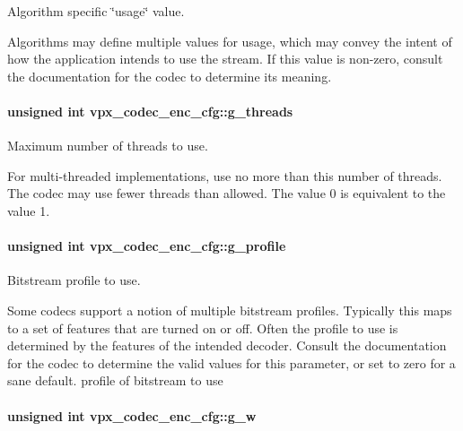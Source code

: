 \-Algorithm specific \char`\"{}usage\char`\"{} value. 

\-Algorithms may define multiple values for usage, which may convey the intent of how the application intends to use the stream. \-If this value is non-\/zero, consult the documentation for the codec to determine its meaning. \hypertarget{structvpx__codec__enc__cfg_aff9d8d458c45c95dd542603210ba2b8b}{
\paragraph[{g\-\_\-threads}]{\setlength{\rightskip}{0pt plus 5cm}unsigned int {\bf vpx\-\_\-codec\-\_\-enc\-\_\-cfg\-::g\-\_\-threads}}}\label{structvpx__codec__enc__cfg_aff9d8d458c45c95dd542603210ba2b8b}


\-Maximum number of threads to use. 

\-For multi-\/threaded implementations, use no more than this number of threads. \-The codec may use fewer threads than allowed. \-The value 0 is equivalent to the value 1. \hypertarget{structvpx__codec__enc__cfg_a3d7fe3a8b237338c094d5a956a41804d}{
\paragraph[{g\-\_\-profile}]{\setlength{\rightskip}{0pt plus 5cm}unsigned int {\bf vpx\-\_\-codec\-\_\-enc\-\_\-cfg\-::g\-\_\-profile}}}\label{structvpx__codec__enc__cfg_a3d7fe3a8b237338c094d5a956a41804d}


\-Bitstream profile to use. 

\-Some codecs support a notion of multiple bitstream profiles. \-Typically this maps to a set of features that are turned on or off. \-Often the profile to use is determined by the features of the intended decoder. \-Consult the documentation for the codec to determine the valid values for this parameter, or set to zero for a sane default. profile of bitstream to use \hypertarget{structvpx__codec__enc__cfg_a5c165f5b41ca1158f2883983a2b7709c}{
\paragraph[{g\-\_\-w}]{\setlength{\rightskip}{0pt plus 5cm}unsigned int {\bf vpx\-\_\-codec\-\_\-enc\-\_\-cfg\-::g\-\_\-w}}}\label{structvpx__codec__enc__cfg_a5c165f5b41ca1158f2883983a2b7709c}


